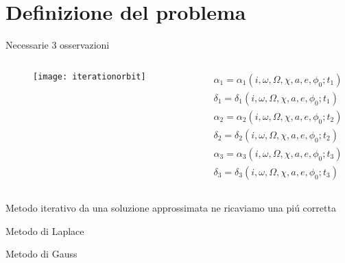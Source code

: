\section{Definizione del problema}

\begin{frame}{Necessarie 3 osservazioni}

\begin{columns}

\begin{column}{0.3\textwidth}

\begin{figure}[!ht]

\texttt{[image: iterationorbit]}

\end{figure}

\end{column}

\begin{column}{0.7\textwidth}

\begin{align*}
&\alpha_1=\alpha_1(i,\omega,\Omega,\chi,a,e,\phi_0;t_1)\\
&\delta_1=\delta_1(i,\omega,\Omega,\chi,a,e,\phi_0;t_1)\\
&\alpha_2=\alpha_2(i,\omega,\Omega,\chi,a,e,\phi_0;t_2)\\
&\delta_2=\delta_2(i,\omega,\Omega,\chi,a,e,\phi_0;t_2)\\
&\alpha_3=\alpha_3(i,\omega,\Omega,\chi,a,e,\phi_0;t_3)\\
&\delta_3=\delta_3(i,\omega,\Omega,\chi,a,e,\phi_0;t_3)
\end{align*}

\end{column}

\end{columns}

\begin{block}{Metodo iterativo}
da una soluzione approssimata ne ricaviamo una pi\'u corretta
\end{block}

\end{frame}

\begin{frame}{Metodo di Laplace}


\end{frame}


\begin{frame}{Metodo di Gauss}


\end{frame}
